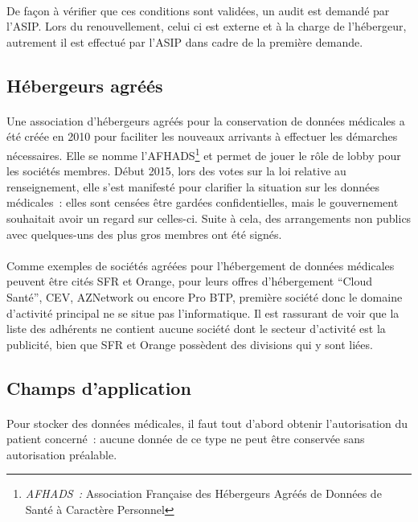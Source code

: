 \paragraph{}
De façon à vérifier que ces conditions sont validées, un audit est demandé par
l'ASIP\@. Lors du renouvellement, celui ci est externe et à la charge de
l'hébergeur, autrement il est effectué par l'ASIP dans cadre de la première
demande.


        \subsection{Hébergeurs agréés}

\paragraph{}
Une association d'hébergeurs agréés pour la conservation de données médicales a
été créée en 2010 pour faciliter les nouveaux arrivants à effectuer les
démarches nécessaires. Elle se nomme l'AFHADS\footnote{\emph{AFHADS~: }
Association Française des Hébergeurs Agréés de Données de Santé à Caractère
Personnel} et permet de jouer le rôle de lobby pour les sociétés membres. Début
2015, lors des votes sur la loi relative au renseignement, elle s'est manifesté
pour clarifier la situation sur les données médicales~: elles sont censées être
gardées confidentielles, mais le gouvernement souhaitait avoir un regard sur
celles-ci. Suite à cela, des arrangements non publics avec quelques-uns des
plus gros membres ont été signés.

\paragraph{}
Comme exemples de sociétés agréées pour l'hébergement de données médicales
peuvent être cités SFR et Orange, pour leurs offres d'hébergement ``Cloud
Santé'', CEV, AZNetwork ou encore Pro BTP, première société donc le domaine
d'activité principal ne se situe pas l'informatique. Il est rassurant de voir
que la liste des adhérents ne contient aucune société dont le secteur
d'activité est la publicité, bien que SFR et Orange possèdent des divisions qui
y sont liées.

        \subsection{Champs d'application}

\paragraph{}
Pour stocker des données médicales, il faut tout d'abord obtenir l'autorisation
du patient concerné~: aucune donnée de ce type ne peut être conservée sans
autorisation préalable.

